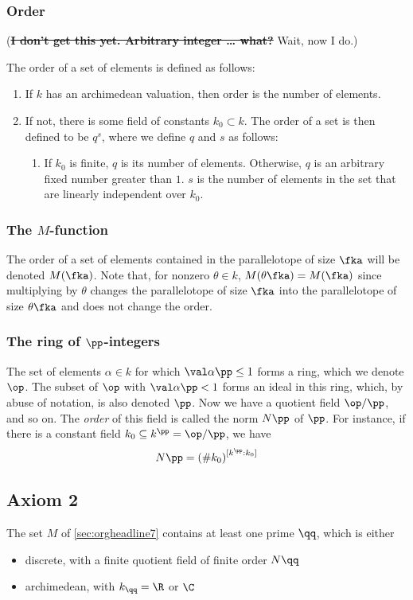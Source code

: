 \documentclass{article}
\begin{document}
\subsubsection{Order}
\label{sec:orgheadline16}
(\sout{\textbf{I don't get this yet. Arbitrary integer \ldots{} what?}} Wait, now I do.)

The order of a set of elements is defined as follows:
\begin{enumerate}
\item If \(k\) has an archimedean valuation, then order is the number of elements.
\label{sec:orgheadline13}
\item If not, there is some field of constants \(k_0\subset k\). The order of a set is then defined to be \(q^s\), where we define \(q\) and \(s\) as follows:
\label{sec:orgheadline15}
\begin{enumerate}
\item If \(k_0\) is finite, \(q\) is its number of elements. Otherwise, \(q\) is an arbitrary fixed number greater than \(1\).
\label{sec:orgheadline14}
\(s\) is the number of elements in the set that are linearly independent over \(k_0\).
\end{enumerate}
\end{enumerate}
\subsubsection{The \(M\)-function}
\label{sec:orgheadline17}
The order of a set of elements contained in the parallelotope of size \(\fka\) will be denoted \(M(\fka)\).
Note that, for nonzero \(\theta\in k\), \(M(\theta\fka)=M(\fka)\) since multiplying by \(\theta\) changes the parallelotope of size \(\fka\) into the parallelotope of size \(\theta\fka\) and does not change the order.
\subsubsection{The ring of \(\pp\)-integers}
\label{sec:orgheadline18}
The set of elements \(\alpha\in k\) for which \(\val\alpha\pp \leq 1\) forms a ring, which we denote \(\op\).
The subset of \(\op\) with \(\val\alpha\pp < 1\) forms an ideal in this ring, which, by abuse of notation, is also denoted \(\pp\). Now we have a quotient field \(\op/\pp\), and so on. The \emph{order} of this field is called the norm \(N\pp\) of \(\pp\). For instance, if there is a constant field \(k_0\subseteq k^{\pp} = \op/\pp\), we have
\[ N\pp = {(\# k_0)}^{[k^\pp : k_0]} \]
\subsection{Axiom 2}
\label{sec:orgheadline20}
The set \(M\) of \ref{sec:orgheadline7} contains at least one prime \(\qq\), which is either
\begin{itemize}
\item discrete, with a finite quotient field of finite order \(N\qq\)
\item archimedean, with \(k_\qq=\R\) or \(\C\)
\end{itemize}
\end{document}
